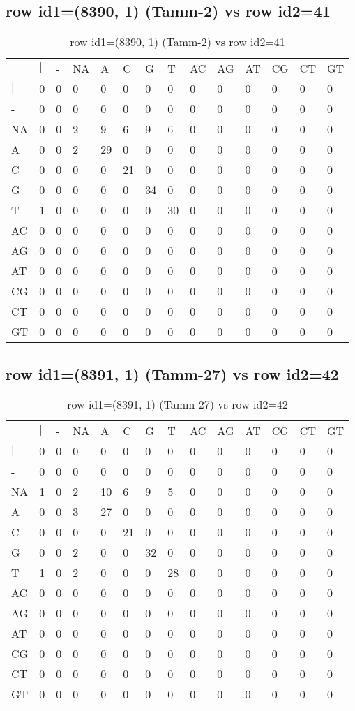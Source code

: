 \subsection{row id1=(8390, 1) (Tamm-2) vs row id2=41}
\begin{center}
\begin{longtable}{|l|l|l|l|l|l|l|l|l|l|l|l|l|l|}
\caption{row id1=(8390, 1) (Tamm-2) vs row id2=41} \label{table_dm448}\\
\hline
\\
\hline
&$|$&-&NA&A&C&G&T&AC&AG&AT&CG&CT&GT\\
$|$&0&0&0&0&0&0&0&0&0&0&0&0&0\\
-&0&0&0&0&0&0&0&0&0&0&0&0&0\\
NA&0&0&2&9&6&9&6&0&0&0&0&0&0\\
A&0&0&2&29&0&0&0&0&0&0&0&0&0\\
C&0&0&0&0&21&0&0&0&0&0&0&0&0\\
G&0&0&0&0&0&34&0&0&0&0&0&0&0\\
T&1&0&0&0&0&0&30&0&0&0&0&0&0\\
AC&0&0&0&0&0&0&0&0&0&0&0&0&0\\
AG&0&0&0&0&0&0&0&0&0&0&0&0&0\\
AT&0&0&0&0&0&0&0&0&0&0&0&0&0\\
CG&0&0&0&0&0&0&0&0&0&0&0&0&0\\
CT&0&0&0&0&0&0&0&0&0&0&0&0&0\\
GT&0&0&0&0&0&0&0&0&0&0&0&0&0\\
\hline
\end{longtable}
\end{center}

\subsection{row id1=(8391, 1) (Tamm-27) vs row id2=42}
\begin{center}
\begin{longtable}{|l|l|l|l|l|l|l|l|l|l|l|l|l|l|}
\caption{row id1=(8391, 1) (Tamm-27) vs row id2=42} \label{table_dm450}\\
\hline
\\
\hline
&$|$&-&NA&A&C&G&T&AC&AG&AT&CG&CT&GT\\
$|$&0&0&0&0&0&0&0&0&0&0&0&0&0\\
-&0&0&0&0&0&0&0&0&0&0&0&0&0\\
NA&1&0&2&10&6&9&5&0&0&0&0&0&0\\
A&0&0&3&27&0&0&0&0&0&0&0&0&0\\
C&0&0&0&0&21&0&0&0&0&0&0&0&0\\
G&0&0&2&0&0&32&0&0&0&0&0&0&0\\
T&1&0&2&0&0&0&28&0&0&0&0&0&0\\
AC&0&0&0&0&0&0&0&0&0&0&0&0&0\\
AG&0&0&0&0&0&0&0&0&0&0&0&0&0\\
AT&0&0&0&0&0&0&0&0&0&0&0&0&0\\
CG&0&0&0&0&0&0&0&0&0&0&0&0&0\\
CT&0&0&0&0&0&0&0&0&0&0&0&0&0\\
GT&0&0&0&0&0&0&0&0&0&0&0&0&0\\
\hline
\end{longtable}
\end{center}

